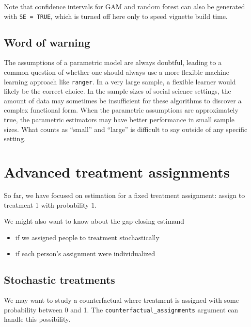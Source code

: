 \documentclass[
]{article}
\providecommand{\tightlist}{%
  \setlength{\itemsep}{0pt}\setlength{\parskip}{0pt}}
\begin{document}
Note that confidence intervals for GAM and random forest can also be generated with \texttt{SE\ =\ TRUE}, which is turned off here only to speed vignette build time.

\hypertarget{word-of-warning}{%
\subsection{Word of warning}\label{word-of-warning}}

The assumptions of a parametric model are always doubtful, leading to a common question of whether one should always use a more flexible machine learning approach like \texttt{ranger}. In a very large sample, a flexible learner would likely be the correct choice. In the sample sizes of social science settings, the amount of data may sometimes be insufficient for these algorithms to discover a complex functional form. When the parametric assumptions are approximately true, the parametric estimators may have better performance in small sample sizes. What counts as ``small'' and ``large'' is difficult to say outside of any specific setting.

\hypertarget{advanced-treatment-assignments}{%
\section{Advanced treatment assignments}\label{advanced-treatment-assignments}}

So far, we have focused on estimation for a fixed treatment assignment: assign to treatment 1 with probability 1.

We might also want to know about the gap-closing estimand

\begin{itemize}
\tightlist
\item
  if we assigned people to treatment stochastically
\item
  if each person's assignment were individualized
\end{itemize}

\hypertarget{stochastic-treatments}{%
\subsection{Stochastic treatments}\label{stochastic-treatments}}

We may want to study a counterfactual where treatment is assigned with some probability between 0 and 1. The \texttt{counterfactual\_assignments} argument can handle this possibility.
\end{document}

